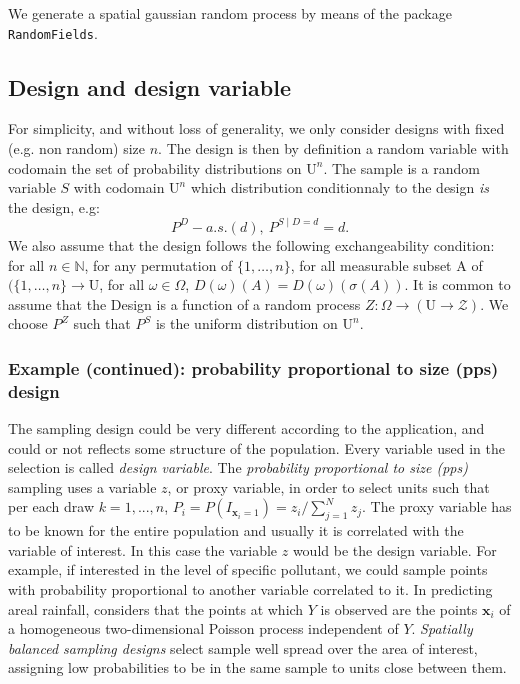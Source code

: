 \documentclass[12pt]{article}
\theoremstyle{definition}
\theoremstyle{remark}
\newcommand{\Design}{D}
\newcommand{\design}{d}
\newcommand{\Sample}{S}
\newcommand{\Pop}{\mathrm{U}}
\newcommand{\position}{\mathbf{x}}
\newcommand{\Signal}{Y}
\newcommand{\Desvar}{Z}
\newcommand{\DesvarSpace}{\mathscr{Z}}
\begin{document}
We generate a spatial gaussian random process by means of the package \texttt{RandomFields}.




\subsection{Design and design variable} \label{sec:design}
For simplicity, and without loss of generality, we only consider designs with fixed (e.g. non random) size $n$.
The design is then by definition a random variable with codomain the set of probability distributions on  $\Pop^n$.
 The sample is a random variable $\Sample$ with codomain $\Pop^n$ which distribution conditionnaly to the design \emph{is} the design, e.g:
$$P^\Design-a.s.(\design),~P^{\Sample\mid \Design=\design}=\design.$$
We also assume that the design follows the following exchangeability condition: for all $n\in\mathbb{N}$, for any permutation of $\{1,\ldots,n\}$, for all measurable subset A of $(\{1,\ldots,n\}\to \Pop$, for all $\omega\in\Omega$,
$D(\omega)(A)=D(\omega)(\sigma(A))$. It is common to assume that the Design is a function of a random process $\Desvar:\Omega\to(\Pop\to \DesvarSpace)$.
We choose $P^Z$ such that $P^S$ is the  uniform distribution on $\Pop^n$.


\subsubsection*{Example (continued): probability proportional to size (pps) design}
The sampling design could be very different according to the application, and could or not reflects some structure of the population. Every variable used in the selection is called \emph{design variable}. The \emph{probability proportional to size (pps)} sampling uses a variable $z$, or proxy variable, in order to select units  such that per each draw $k=1,...,n$, $P_{i}=P\left(I_{\position_{i}=1}\right)=z_{i}/\sum_{j=1}^{N}{z_{j}}$. The proxy variable has to be known for the entire population and usually it is correlated with the variable of interest. In this case the variable $z$ would be the design variable. For example, if interested in the level of specific pollutant, we could sample points with probability proportional to another variable correlated to it. In predicting areal rainfall, \cite{Kaar} considers that the points at which $Y$ is observed are the points $\position_{i}$ of a homogeneous two-dimensional Poisson process independent of $\Signal$. \emph{Spatially balanced sampling designs} select sample well spread over the area of interest, assigning low probabilities to be in the same sample to units close between them.
\end{document}
